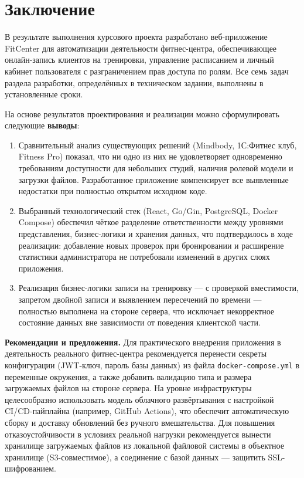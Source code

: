 \section*{Заключение}

В результате выполнения курсового проекта разработано веб-приложение
FitCenter для автоматизации деятельности фитнес-центра, обеспечивающее
онлайн-запись клиентов на тренировки, управление расписанием и личный
кабинет пользователя с разграничением прав доступа по ролям. Все семь
задач раздела разработки, определённых в техническом задании, выполнены
в установленные сроки.

На основе результатов проектирования и реализации можно сформулировать
следующие \textbf{выводы}:

\begin{enumerate}
    \item Сравнительный анализ существующих решений (Mindbody, 1С:Фитнес
    клуб, Fitness Pro) показал, что ни одно из них не удовлетворяет
    одновременно требованиям доступности для небольших студий, наличия
    ролевой модели и загрузки файлов. Разработанное приложение компенсирует
    все выявленные недостатки при полностью открытом исходном коде.
    \item Выбранный технологический стек (React, Go/Gin, PostgreSQL,
    Docker Compose) обеспечил чёткое разделение ответственности между
    уровнями представления, бизнес-логики и хранения данных, что
    подтвердилось в ходе реализации: добавление новых проверок
    при бронировании и расширение статистики администратора не
    потребовали изменений в других слоях приложения.
    \item Реализация бизнес-логики записи на тренировку --- с проверкой
    вместимости, запретом двойной записи и выявлением пересечений
    по времени --- полностью выполнена на стороне сервера, что
    исключает некорректное состояние данных вне зависимости от
    поведения клиентской части.
\end{enumerate}
\textbf{Рекомендации и предложения.} Для практического внедрения приложения
в деятельность реального фитнес-центра рекомендуется перенести секреты
конфигурации (JWT-ключ, пароль базы данных) из файла \texttt{docker-compose.yml}
в переменные окружения, а также добавить валидацию типа и размера
загружаемых файлов на стороне сервера. На уровне инфраструктуры целесообразно
использовать модель облачного развёртывания с настройкой CI/CD-пайплайна
(например, GitHub Actions), что обеспечит автоматическую сборку и доставку
обновлений без ручного вмешательства. Для повышения отказоустойчивости
в условиях реальной нагрузки рекомендуется вынести хранилище загружаемых
файлов из локальной файловой системы в объектное хранилище (S3-совместимое),
а соединение с базой данных --- защитить SSL-шифрованием.

